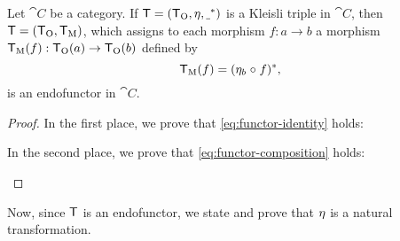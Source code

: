 \begin{proposition}
  \label{prop:triple-to-endofunctor}


  Let $\cat{C}$ be a category. If $\mathsf{T} = (\mathsf{T}_{\operatorname{O}}, \eta,
  \underline{~}^*)$ is a Kleisli triple in $\cat{C}$, then
  $\mathsf{T} = (\mathsf{T}_{\operatorname{O}}, \mathsf{T}_{\operatorname{M}})$, which assigns to each morphism
  $f: a \to b$ a morphism $\mathsf{T}_{\operatorname{M}}(f): \mathsf{T}_{\operatorname{O}}(a) \to
  \mathsf{T}_{\operatorname{O}}(b)$ defined by
  \begin{equation}
    \label{eq:triple-to-endofunctor-morphism-function}
    \mathsf{T}_{\operatorname{M}}(f) = (\eta_{b} \mathrel{\circ} f)^*
    \text{,}
  \end{equation}
  is an endofunctor in $\cat{C}$.

  \begin{proof}

    In the first place, we prove that \eqref{eq:functor-identity}
    holds:
    \begin{steps}
    \end{steps}
    In the second place, we prove that \eqref{eq:functor-composition}
    holds:
    \begin{steps}
    \end{steps}

  \end{proof}

\end{proposition}

Now, since $\mathsf{T}$ is an endofunctor, we state and prove that
$\eta$ is a natural transformation.

